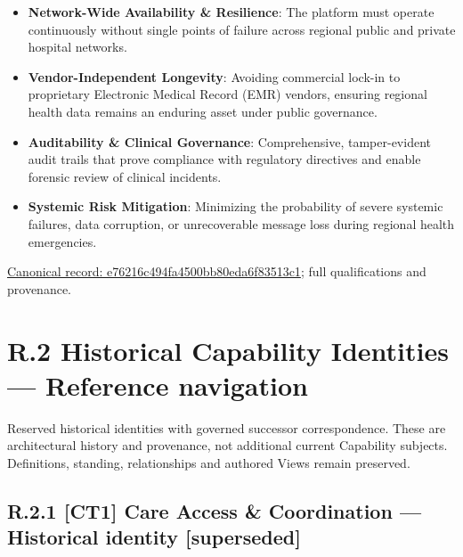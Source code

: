 \begin{itemize}


\item \textbf{Network-Wide Availability \& Resilience}: The platform must operate continuously without single points of failure across regional public and private hospital networks.

\item \textbf{Vendor-Independent Longevity}: Avoiding commercial lock-in to proprietary Electronic Medical Record (EMR) vendors, ensuring regional health data remains an enduring asset under public governance.

\item \textbf{Auditability \& Clinical Governance}: Comprehensive, tamper-evident audit trails that prove compliance with regulatory directives and enable forensic review of clinical incidents.

\item \textbf{Systemic Risk Mitigation}: Minimizing the probability of severe systemic failures, data corruption, or unrecoverable message loss during regional health emergencies.

\end{itemize}

{\footnotesize \href{../../../../continuum/motivation/stakeholder/e76216c494fa4500bb80eda6f83513c1.md}{Canonical record: e76216c494fa4500bb80eda6f83513c1}; full qualifications and provenance.}\par
\chapter*{R.2 Historical Capability Identities — Reference navigation}
\label{navigation:R.2}

Reserved historical identities with governed successor correspondence. These are architectural history and provenance, not additional current Capability subjects. Definitions, standing, relationships and authored Views remain preserved.\par
\section*{R.2.1 [CT1] Care Access \& Coordination — Historical identity [superseded]}
\label{navigation:R.2.1}

